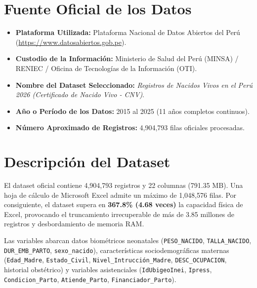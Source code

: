 \documentclass[12pt,a4paper]{article}
\begin{document}
\section{Fuente Oficial de los Datos}

\begin{itemize}
    \item \textbf{Plataforma Utilizada:} Plataforma Nacional de Datos Abiertos del Perú (\url{https://www.datosabiertos.gob.pe}).
    \item \textbf{Custodio de la Información:} Ministerio de Salud del Perú (MINSA) / RENIEC / Oficina de Tecnologías de la Información (OTI).
    \item \textbf{Nombre del Dataset Seleccionado:} \textit{Registros de Nacidos Vivos en el Perú 2026 (Certificado de Nacido Vivo - CNV)}.
    \item \textbf{Año o Período de los Datos:} 2015 al 2025 (11 años completos continuos).
    \item \textbf{Número Aproximado de Registros:} 4,904,793 filas oficiales procesadas.
\end{itemize}

\section{Descripción del Dataset}

El dataset oficial contiene 4,904,793 registros y 22 columnas (791.35 MB). Una hoja de cálculo de Microsoft Excel admite un máximo de 1,048,576 filas. Por consiguiente, el dataset supera en \textbf{367.8\% (4.68 veces)} la capacidad física de Excel, provocando el truncamiento irrecuperable de más de 3.85 millones de registros y desbordamiento de memoria RAM.

Las variables abarcan datos biométricos neonatales (\texttt{PESO\_NACIDO}, \texttt{TALLA\_NACIDO}, \texttt{DUR\_EMB\_PARTO}, \texttt{sexo\_nacido}), características sociodemográficas maternas (\texttt{Edad\_Madre}, \texttt{Estado\_Civil}, \texttt{Nivel\_Intrucción\_Madre}, \texttt{DESC\_OCUPACION}, historial obstétrico) y variables asistenciales (\texttt{IdUbigeoInei}, \texttt{Ipress}, \texttt{Condicion\_Parto}, \texttt{Atiende\_Parto}, \texttt{Financiador\_Parto}).
\end{document}
